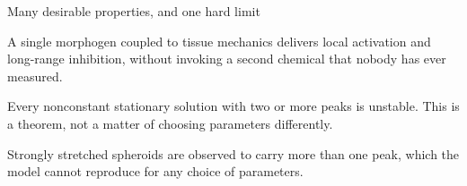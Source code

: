 \begin{frame}{Many desirable properties, and one hard limit}

  \vspace{0.34cm}

    {A single morphogen coupled to tissue mechanics delivers local activation
     and long-range inhibition, without invoking a second chemical that nobody
     has ever measured.}

  \vspace{0.20cm}

    {Every nonconstant stationary solution with two or more peaks is unstable.
     This is a theorem, not a matter of choosing parameters differently.}

  \vspace{0.20cm}

    {Strongly stretched spheroids are observed to carry more than one peak,
     which the model cannot reproduce for any choice of parameters.}

\end{frame}


\begin{frame}[plain]
\end{frame}
